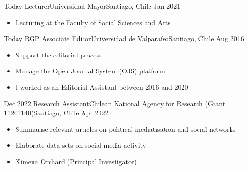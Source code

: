 






\begin{experiences}
  \emptySeparator 
  \experience 
    {Today} {Lecturer}{Universidad Mayor}{Santiago, Chile} {Jan 2021}
    {\begin{itemize}
    \item Lecturing at the Faculty of Social Sciences and Arts
    \end{itemize}}
    {}
\end{experiences}
\vspace{-2mm}

\begin{experiences}
  \experience
    {Today} {RGP Associate Editor}{Universidad de Valparaíso}{Santiago, Chile} {Aug 2016}
    {\begin{itemize}
    \item Support the editorial process
    \item Manage the Open Journal System (OJS) platform 
    \item I worked as an Editorial Assistant between 2016 and 2020
    \end{itemize}}
    {}
\end{experiences}
\vspace{-2mm}

\begin{experiences}
  \emptySeparator 
  \experience 
    {Dec 2022} {Research Assistant}{Chilean National Agency for Research (Grant 11201140)}{Santiago, Chile} {Apr 2022}
    {\begin{itemize}
    \item Summarise relevant articles on political mediatisation and social networks
    \item Elaborate data sets on social media activity
    \item Ximena Orchard {\small (Principal Investigator)}
    \end{itemize}}
    {}
\end{experiences}
\vspace{-2mm}

